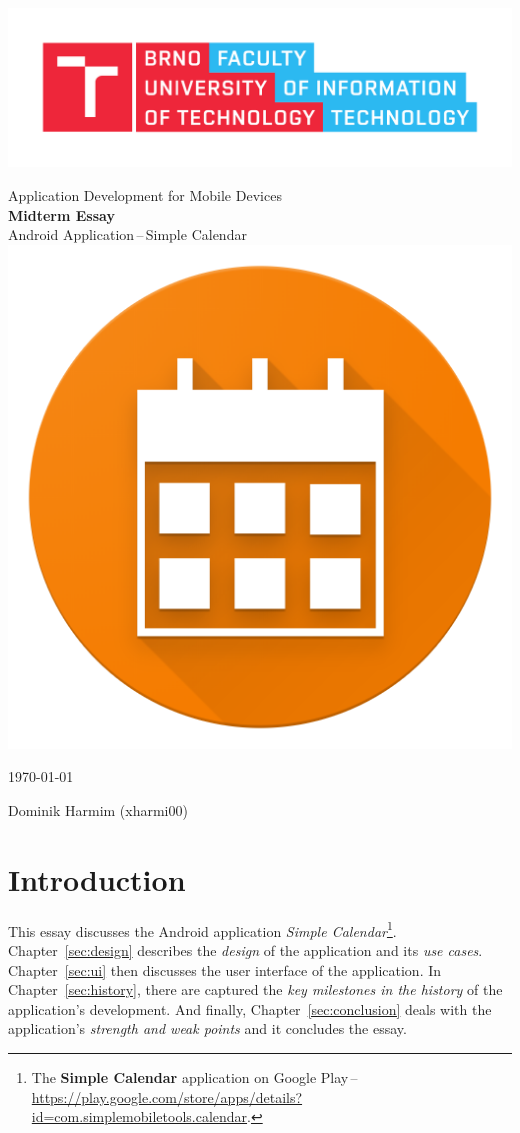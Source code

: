 \documentclass[a4paper, 11pt]{article}
\begin{document}
	\begin{titlepage}
		\begin{center}
			\includegraphics[width=.77 \linewidth]{img/FIT_logo.pdf}


			\Huge{Application Development for Mobile Devices} \\
			\LARGE{\textbf{Midterm Essay}} \\
			\Large{Android Application\,--\,Simple Calendar} \\[1.5em]
			\includegraphics[width=.15 \linewidth]{img/icon.png}

		\end{center}

		\begin{minipage}{.4 \textwidth}
			\Large
			\today
		\end{minipage}
%
		\hfill
%
		\begin{minipage}[r]{.4 \textwidth}
			\Large
			Dominik Harmim (xharmi00)
		\end{minipage}
	\end{titlepage}


	\section{Introduction}

	This essay discusses the Android application \emph{Simple
	Calendar}\footnote{%
		The \textbf{Simple Calendar} application on Google Play\,--\,%
		\url{https://play.google.com/store/apps/details?id=com.simplemobiletools.calendar}.
	}. Chapter~\ref{sec:design} describes the \emph{design} of the 
	application and its \emph{use cases}. Chapter~\ref{sec:ui} then 
	discusses the user interface of the application. In
	Chapter~\ref{sec:history}, there are captured the \emph{key milestones 
	in the history} of the application's development. And finally,
	Chapter~\ref{sec:conclusion} deals with the application's \emph{strength 
	and weak points} and it concludes the essay.
\end{document}
